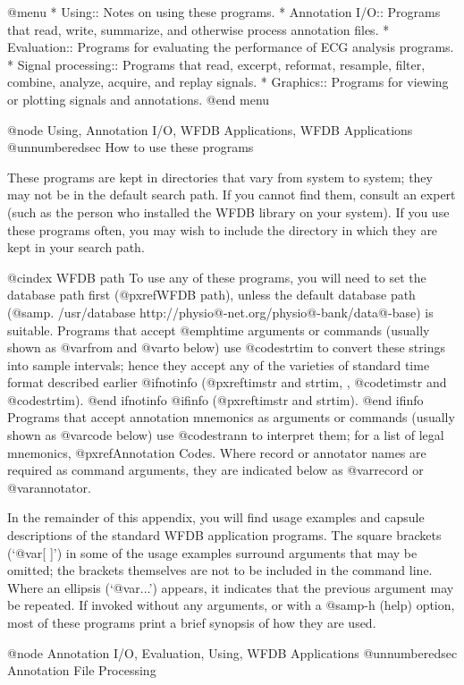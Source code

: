 {{{{{{{{@menu
* Using::		Notes on using these programs.
* Annotation I/O::	Programs that read, write, summarize, and
			otherwise process annotation files.
* Evaluation::		Programs for evaluating the performance of ECG
			analysis programs.
* Signal processing::	Programs that read, excerpt, reformat, resample,
			filter, combine, analyze, acquire, and replay signals.
* Graphics::		Programs for viewing or plotting signals and
			annotations.
@end menu

@node     Using, Annotation I/O, WFDB Applications, WFDB Applications
@unnumberedsec How to use these programs

These programs are kept in directories that vary from system to system;
they may not be in the default search path.  If you cannot find them,
consult an expert (such as the person who installed the WFDB library on
your system).  If you use these programs often, you may wish to include
the directory in which they are kept in your search path.

@cindex WFDB path
To use any of these programs, you will need to set the database path first
(@pxref{WFDB path}), unless the default database path
(@samp{. /usr/database http://physio@-net.org/physio@-bank/data@-base})
is suitable. Programs that accept @emph{time} arguments or commands (usually
shown as @var{from} and @var{to} below) use @code{strtim} to convert these
strings into sample intervals; hence they accept any of the varieties of
standard time format described earlier
@ifnotinfo
(@pxref{timstr and strtim, , @code{timstr} and @code{strtim}}).
@end ifnotinfo
@ifinfo
(@pxref{timstr and strtim}).
@end ifinfo
Programs that accept annotation mnemonics as arguments or commands
(usually shown as @var{code} below) use @code{strann} to interpret them;
for a list of legal mnemonics, @pxref{Annotation Codes}.  Where record
or annotator names are required as command arguments, they are indicated
below as @var{record} or @var{annotator}.

In the remainder of this appendix, you will find usage examples and
capsule descriptions of the standard WFDB application programs.  The
square brackets (`@var{[ ]}') in some of the usage examples surround
arguments that may be omitted;  the brackets themselves are not
to be included in the command line.  Where an ellipsis (`@var{...}')
appears, it indicates that the previous argument may be repeated.
If invoked without any arguments, or with a @samp{-h} (help) option, most of
these programs print a brief synopsis of how they are used.

@node     Annotation I/O, Evaluation, Using, WFDB Applications
@unnumberedsec Annotation File Processing

}}}}}}}}
